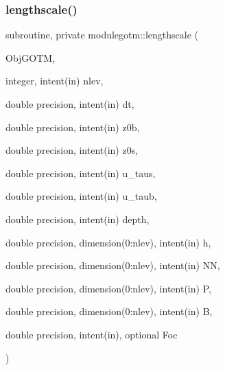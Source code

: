 \subsubsection{\texorpdfstring{lengthscale()}{lengthscale()}}
{\footnotesize\ttfamily subroutine, private modulegotm\+::lengthscale (\begin{DoxyParamCaption}\item[{}]{Obj\+G\+O\+TM,  }\item[{integer, intent(in)}]{nlev,  }\item[{double precision, intent(in)}]{dt,  }\item[{double precision, intent(in)}]{z0b,  }\item[{double precision, intent(in)}]{z0s,  }\item[{double precision, intent(in)}]{u\+\_\+taus,  }\item[{double precision, intent(in)}]{u\+\_\+taub,  }\item[{double precision, intent(in)}]{depth,  }\item[{double precision, dimension(0\+:nlev), intent(in)}]{h,  }\item[{double precision, dimension(0\+:nlev), intent(in)}]{NN,  }\item[{double precision, dimension(0\+:nlev), intent(in)}]{P,  }\item[{double precision, dimension(0\+:nlev), intent(in)}]{B,  }\item[{double precision, intent(in), optional}]{Foc }\end{DoxyParamCaption})\hspace{0.3cm}{\ttfamily [private]}}

